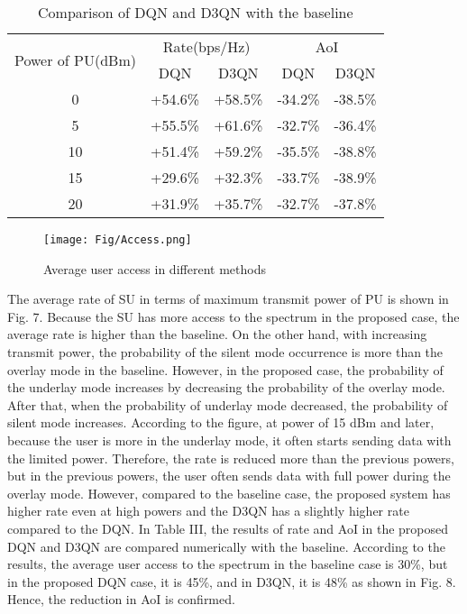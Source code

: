\documentclass[journal]{IEEEtran}
\begin{document}
		\begin{table}[!t]
			\centering
			\caption{Comparison of DQN and D3QN with the baseline}
			\label{Table3}
			\begin{tabular}{|c|c|c|c|c|}
				\hline
				\multirow{2}{*}{Power of PU(dBm)} & \multicolumn{2}{c|}{Rate(bps/Hz)} & \multicolumn{2}{c|}{AoI} \\ \cline{2-5} 
				& DQN             & D3QN            & DQN         & D3QN       \\ \hline
				0                                 & +54.6\%         & +58.5\%         & -34.2\%     & -38.5\%    \\ \hline
				5                                 & +55.5\%         & +61.6\%         & -32.7\%     & -36.4\%    \\ \hline
				10                                & +51.4\%         & +59.2\%         & -35.5\%     & -38.8\%    \\ \hline
				15                                & +29.6\%         & +32.3\%         & -33.7\%     & -38.9\%    \\ \hline
				20                                & +31.9\%         & +35.7\%         & -32.7\%     & -37.8\%    \\ \hline
			\end{tabular}
		\end{table}
		\begin{figure}[!t]
			\centering
			\texttt{[image: Fig/Access.png]}
			\caption{Average user access in different methods}
			\label{Access}
		\end{figure}
		
		The average rate of SU in terms of maximum transmit power of PU is shown in Fig. 7. Because the SU has more access to the spectrum in the proposed case, the average rate is higher than the baseline. On the other hand, with increasing transmit power, the probability of the silent mode occurrence is more than the overlay mode in the baseline. However, in the proposed case, the probability of the underlay mode increases by decreasing the probability of the overlay mode. After that, when the probability of underlay mode decreased, the probability of silent mode increases. According to the figure, at power of 15 dBm and later, because the user is more in the underlay mode, it often starts sending data with the limited power. Therefore, the rate is reduced more than the previous powers, but in the previous powers, the user often sends data with full power during the overlay mode. However, compared to the baseline case, the proposed system has higher rate even at high powers and the D3QN has a slightly higher rate compared to the DQN.
		In Table III, the results of rate and AoI in the proposed DQN and D3QN are compared numerically with the baseline.
		According to the results, the average user access to the spectrum in the baseline case is 30\%, but in the proposed DQN case, it is 45\%, and in D3QN, it is 48\% as shown in Fig. 8. Hence, the reduction in AoI is confirmed.
\end{document}
